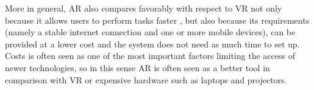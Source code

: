 More in general, AR also compares favorably with respect to \gls{VR} not only because it allows users to perform tasks faster \citep{7833028}, but also because its requirements (namely a stable internet connection and one or more mobile devices), can be provided at a lower cost and the system does not need as much time to set up. Costs is often seen as one of the most important factors limiting the access of newer technologies, so in this sense AR is often seen as a better tool in comparison with VR or expensive hardware such as laptops and projectors.